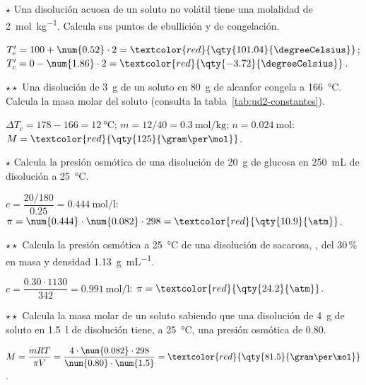 \begin{exercise}
    \(\star\) Una disolución acuosa de un soluto no volátil tiene una molalidad de \qty{2}{\mol\per\kilo\gram}. Calcula sus puntos
    de ebullición y de congelación.
    \begin{solu}
        \(T_e' = 100 + \num{0.52} \cdot 2 = \textcolor{red}{\qty{101.04}{\degreeCelsius}}\); \(T_c' = 0 - \num{1.86} \cdot 2 = \textcolor{red}{\qty{-3.72}{\degreeCelsius}}\).
    \end{solu}
\end{exercise}

\begin{exercise}
    \(\star\star\) Una disolución de \qty{3}{\gram} de un soluto en \qty{80}{\gram} de alcanfor congela a \qty{166}{\degreeCelsius}.
    Calcula la masa molar del soluto (consulta la tabla~\ref{tab:ud2-constantes}).
    \begin{solu}
        \(\Delta T_c = 178 - 166 = \qty{12}{\degreeCelsius}\); \(m = 12/40 = \qty{0.3}{\mol\per\kilo\gram}\); \(n = \qty{0.024}{\mol}\):
        \(M = \textcolor{red}{\qty{125}{\gram\per\mol}}\).
    \end{solu}
\end{exercise}

\begin{exercise}
    \(\star\) Calcula la presión osmótica de una disolución de \qty{20}{\gram} de glucosa en \qty{250}{\mL} de disolución a
    \qty{25}{\degreeCelsius}.
    \begin{solu}
        \(c = \dfrac{20/180}{\num{0.25}} = \qty{0.444}{\mol\per\litre}\): \(\pi = \num{0.444} \cdot \num{0.082} \cdot 298 = \textcolor{red}{\qty{10.9}{\atm}}\).
    \end{solu}
\end{exercise}

\begin{exercise}
    \(\star\star\) Calcula la presión osmótica a \qty{25}{\degreeCelsius} de una disolución de sacarosa, , del 30\,\% en
    masa y densidad \qty{1.13}{\gram\per\mL}.
    \begin{solu}
        \(c = \dfrac{\num{0.30} \cdot 1130}{342} = \qty{0.991}{\mol\per\litre}\): \(\pi = \textcolor{red}{\qty{24.2}{\atm}}\).
    \end{solu}
\end{exercise}

\begin{exercise}
    \(\star\star\) Calcula la masa molar de un soluto sabiendo que una disolución de \qty{4}{\gram} de soluto en \qty{1.5}{\litre}
    de disolución tiene, a \qty{25}{\degreeCelsius}, una presión osmótica de \qty{0.80}{\atm}.
    \begin{solu}
        \(M = \dfrac{m R T}{\pi V} = \dfrac{4 \cdot \num{0.082} \cdot 298}{\num{0.80} \cdot \num{1.5}} = \textcolor{red}{\qty{81.5}{\gram\per\mol}}\).
    \end{solu}
\end{exercise}

